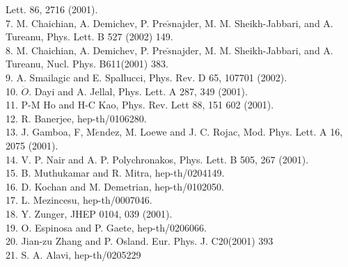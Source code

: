 \documentclass[a4paper,a4paper]{article}
\begin{document}
Lett. 86, 2716 (2001).\\
7. M. Chaichian, A. Demichev, P. Pre$\breve{s}$najder, M. M.
Sheikh-Jabbari, and A. Tureanu, Phys. Lett. B 527 (2002) 149.\\
8. M. Chaichian, A. Demichev, P. Pre$\breve{s}$najder, M. M.
Sheikh-Jabbari, and A. Tureanu, Nucl. Phys. B611(2001) 383.\\
9. A. Smailagic and E. Spallucci, Phys. Rev. D 65, 107701
(2002).\\
10. $\ddot{O}$. Dayi and A. Jellal, Phys. Lett. A 287, 349
(2001).\\
11. P-M Ho and H-C Kao, Phys. Rev. Lett 88, 151 602 (2001).\\
12. R. Banerjee, hep-th/0106280. \\
13. J. Gamboa, F, M$\acute{e}$ndez, M. Loewe and J. C. Rojac, Mod.
Phys. Lett. A 16, 2075 (2001).\\
14. V. P. Nair and A. P. Polychronakos, Phys. Lett. B 505, 267
(2001).\\
15. B. Muthukamar and R. Mitra, hep-th/0204149.\\
16. D. Kochan and M. Demetrian, hep-th/0102050.\\
17. L. Mezincesu, hep-th/0007046.\\
18. Y. Zunger, JHEP 0104, 039 (2001).\\
19. O. Espinosa and P. Gaete, hep-th/0206066.\\
20. Jian-zu Zhang and P. Osland. Eur. Phys. J. C20(2001) 393\\
21. S. A. Alavi, hep-th/0205229
\end{document}
